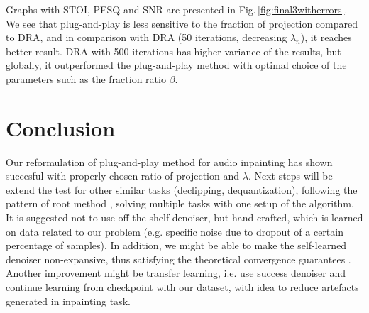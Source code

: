 \documentclass[conference]{IEEEtran}
\newcommand{\todo}[1]{\textcolor{red}{#1}}
\begin{document}



Graphs with STOI, PESQ and SNR are presented in Fig.\,\ref{fig:final3witherrors}.
We see that plug-and-play is less sensitive to the fraction of projection compared to DRA,
and in comparison with DRA (50 iterations, decreasing $\lambda_n$), it reaches better result.
DRA with 500 iterations has higher variance of the results, but globally, it outperformed the plug-and-play method with optimal choice of the parameters such as the fraction ratio $\beta$.








\section{Conclusion}
\label{sec:conclusion}

Our reformulation of plug-and-play method for audio inpainting has shown succesful with properly chosen ratio of projection and $\lambda$.
Next steps will be extend the test for other similar tasks (declipping, dequantization), following the pattern of root method \cite{Chan2016}, solving multiple tasks with one setup of the algorithm.
It is suggested not to use off-the-shelf denoiser, but hand-crafted, which is learned on data related to our problem (e.g. specific noise due to dropout of a certain percentage of samples).
In addition,
we might be able to make the self-learned denoiser non-expansive, thus satisfying the theoretical convergence guarantees \cite{Venkatakrishnan2013,Chan2016}.
Another improvement might be transfer learning,
i.e. use success denoiser and continue learning from checkpoint with our dataset,
with idea to reduce artefacts generated in inpainting task.
\end{document}

